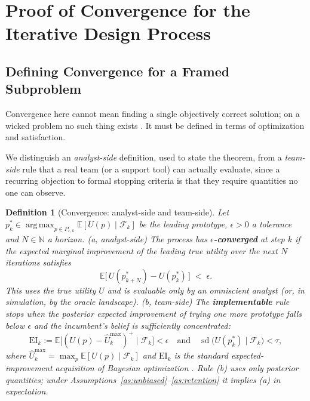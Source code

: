 \documentclass[11pt]{article}
\DeclareMathOperator*{\argmax}{arg\,max}
\newtheorem{definition}{Definition}
\newcommand{\E}{\mathbb{E}}
\newcommand{\filt}{\mathcal{F}}     %
\begin{document}
\section{Proof of Convergence for the Iterative Design Process}

\subsection{Defining Convergence for a Framed Subproblem}

Convergence here cannot mean finding a single objectively correct solution; on a wicked problem no such thing exists \citep{rittel1973, moustakas2023}. It must be defined in terms of optimization and satisfaction.





We distinguish an \emph{analyst-side} definition, used to state the theorem, from a \emph{team-side} rule that a real team (or a support tool) can actually evaluate, since a recurring objection to formal stopping criteria is that they require quantities no one can observe.

\begin{definition}[Convergence: analyst-side and team-side]
\label{def:convergence}
Let $p_k^* \in \argmax_{p\in P_{r,k}} \E[U(p)\mid\filt_k]$ be the leading prototype, $\epsilon>0$ a tolerance and $N\in\mathbb{N}$ a horizon.
\emph{(a, analyst-side)} The process has \textbf{$\epsilon$-converged} at step $k$ if the expected marginal improvement of the leading \emph{true} utility over the next $N$ iterations satisfies
\begin{equation}
\label{eq:eps}
\E\!\big[\,U(p_{k+N}^*) - U(p_k^*)\,\big] \;<\; \epsilon .
\end{equation}
This uses the true utility $U$ and is evaluable only by an omniscient analyst (or, in simulation, by the oracle landscape).
\emph{(b, team-side)} The \textbf{implementable} rule stops when the posterior \emph{expected improvement} of trying one more prototype falls below $\epsilon$ and the incumbent's belief is sufficiently concentrated:
\begin{equation}
\label{eq:ei}
\mathrm{EI}_k := \E\!\big[(U(p)-\hat{U}_k^{\max})^+ \mid \filt_k\big] < \epsilon
\quad\text{and}\quad \operatorname{sd}\!\big(U(p^*_k)\mid\filt_k\big) < \tau,
\end{equation}
where $\hat{U}_k^{\max}=\max_p \E[U(p)\mid\filt_k]$ and $\mathrm{EI}_k$ is the standard expected-improvement acquisition of Bayesian optimization \citep{shahriari2016}. Rule (b) uses only posterior quantities; under Assumptions~\ref{as:unbiased}--\ref{as:retention} it implies (a) in expectation.
\end{definition}
\end{document}
